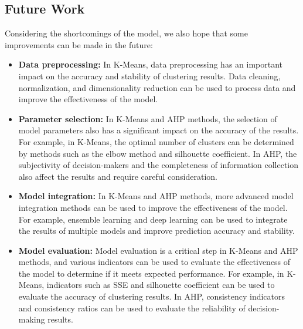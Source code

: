 \subsection{Future Work}
Considering the shortcomings of the model, we also hope that some improvements can be made in the future:
\begin{itemize}
    \item \textbf{Data preprocessing:} In K-Means, data preprocessing has an important impact on the accuracy and stability of clustering results. Data cleaning, normalization, and dimensionality reduction can be used to process data and improve the effectiveness of the model.
    
    \item \textbf{Parameter selection:} In K-Means and AHP methods, the selection of model parameters also has a significant impact on the accuracy of the results. For example, in K-Means, the optimal number of clusters can be determined by methods such as the elbow method and silhouette coefficient. In AHP, the subjectivity of decision-makers and the completeness of information collection also affect the results and require careful consideration.
    
    
    \item \textbf{Model integration:} In K-Means and AHP methods, more advanced model integration methods can be used to improve the effectiveness of the model. For example, ensemble learning and deep learning can be used to integrate the results of multiple models and improve prediction accuracy and stability.
    
    \item \textbf{Model evaluation:} Model evaluation is a critical step in K-Means and AHP methods, and various indicators can be used to evaluate the effectiveness of the model to determine if it meets expected performance. For example, in K-Means, indicators such as SSE and silhouette coefficient can be used to evaluate the accuracy of clustering results. In AHP, consistency indicators and consistency ratios can be used to evaluate the reliability of decision-making results.
\end{itemize}

